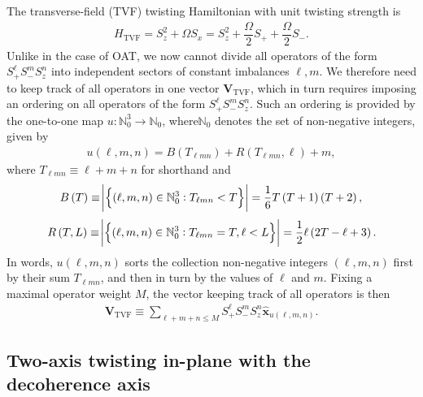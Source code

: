 \documentclass[aps,notitlepage,nofootinbib,11pt]{revtex4-1}
\renewcommand{\t}{\text} %
\newcommand{\f}[2]{\dfrac{#1}{#2}} %
\newcommand{\p}[1]{\left(#1\right)} %
\renewcommand{\set}[1]{\left\{#1\right\}} %
\renewcommand{\v}{\bm} %
\newcommand{\uv}[1]{\v{\hat{#1}}} %
\newcommand{\N}{\mathbb{N}}
\newcommand{\1}{\mathds{1}}
\begin{document}
The transverse-field (TVF) twisting Hamiltonian with unit twisting
strength is
\begin{align}
  H_{\t{TVF}}
  = S_z^2 + \Omega S_x
  = S_z^2 + \f{\Omega}{2} S_+ + \f{\Omega}{2} S_-.
\end{align}
Unlike in the case of OAT, we now cannot divide all operators of the
form $S_+^\ell S_-^m S_z^n$ into independent sectors of constant
imbalances $\ell,m$.  We therefore need to keep track of all operators
in one vector $\v V_{\t{TVF}}$, which in turn requires imposing an
ordering on all operators of the form $S_+^\ell S_-^m S_z^n$.  Such an
ordering is provided by the one-to-one map $u:\N_0^3\to\N_0$, where$
\N_0$ denotes the set of non-negative integers, given by
\begin{align}
  u\p{\ell,m,n} = B\p{T_{\ell mn}} + R\p{T_{\ell mn},\ell} + m,
  \label{eq:vec_map}
\end{align}
where $T_{\ell mn}\equiv\ell+m+n$ for shorthand and
\begin{align}
  B\p{T}
  \equiv \abs{\set{\p{\ell,m,n}\in\N_0^3 : T_{\ell mn}<T}}
  = \f16 T \p{T+1} \p{T+2},
\end{align}
\begin{align}
  R\p{T,L}
  \equiv \abs{\set{\p{\ell,m,n}\in\N_0^3 : T_{\ell mn}=T , \ell<L}}
  = \f12 \ell \p{2 T - \ell + 3}.
\end{align}
In words, $u\p{\ell,m,n}$ sorts the collection non-negative integers
$\p{\ell,m,n}$ first by their sum $T_{\ell mn}$, and then in turn by
the values of $\ell$ and $m$.  Fixing a maximal operator weight $M$,
the vector keeping track of all operators is then
\begin{align}
  \v V_{\t{TVF}}
  \equiv \sum_{\ell+m+n\le M} S_+^\ell S_-^m S_z^n \uv x_{u\p{\ell,m,n}}.
\end{align}


\subsection{Two-axis twisting in-plane with the decoherence axis}
\end{document}
